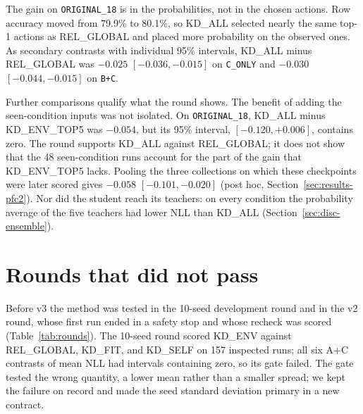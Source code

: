 The gain on \texttt{ORIGINAL\_18} is in the probabilities, not in the
chosen actions. Row accuracy moved from 79.9\% to 80.1\%, so KD\_ALL
selected nearly the same top-1 actions as REL\_GLOBAL and placed more
probability on the observed ones. As secondary contrasts with individual 95\% intervals, KD\_ALL minus
REL\_GLOBAL was $-0.025$ $[-0.036, -0.015]$ on \texttt{C\_ONLY} and
$-0.030$ $[-0.044, -0.015]$ on \texttt{B+C}.

Further comparisons qualify what the round shows. The benefit of
adding the seen-condition inputs was not isolated. On
\texttt{ORIGINAL\_18}, KD\_ALL minus KD\_ENV\_TOP5 was $-0.054$, but
its 95\% interval, $[-0.120, +0.006]$, contains zero. The round
supports KD\_ALL against REL\_GLOBAL; it does not show that the 48
seen-condition runs account for the part of the gain that
KD\_ENV\_TOP5 lacks. Pooling the three collections on which these
checkpoints were later scored gives $-0.058$ $[-0.101, -0.020]$
(post hoc, Section~\ref{sec:results-pfc2}). Nor did the student reach its teachers: on every condition the
probability average of the five teachers had lower NLL than KD\_ALL
(Section~\ref{sec:disc-ensemble}).

\section{Rounds that did not pass}
\label{sec:results-failed}

Before v3 the method was tested in the 10-seed development round and
in the v2 round, whose first run ended in a safety stop and whose
recheck was scored (Table~\ref{tab:rounds}). The 10-seed round scored
KD\_ENV against REL\_GLOBAL, KD\_FIT, and KD\_SELF on 157 inspected
runs; all six A+C contrasts of mean NLL had intervals containing zero,
so its gate failed. The gate tested the wrong quantity, a lower mean
rather than a smaller spread; we kept the failure on record and made
the seed standard deviation primary in a new contract.

